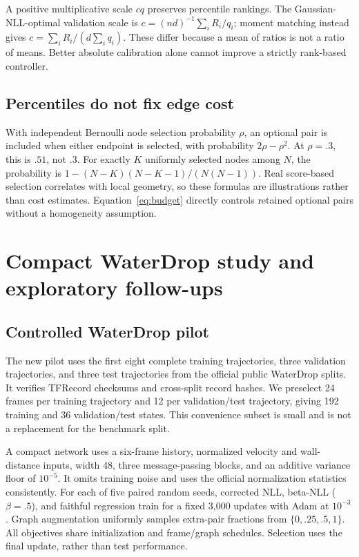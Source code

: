 A positive multiplicative scale $cq$ preserves percentile rankings. The Gaussian-NLL-optimal validation scale is $c=(nd)^{-1}\sum_iR_i/q_i$; moment matching instead gives $c=\sum_iR_i/(d\sum_iq_i)$. These differ because a mean of ratios is not a ratio of means. Better absolute calibration alone cannot improve a strictly rank-based controller.

\subsection{Percentiles do not fix edge cost}
With independent Bernoulli node selection probability $\rho$, an optional pair is included when either endpoint is selected, with probability $2\rho-\rho^2$. At $\rho=.3$, this is $.51$, not $.3$. For exactly $K$ uniformly selected nodes among $N$, the probability is $1-(N-K)(N-K-1)/(N(N-1))$. Real score-based selection correlates with local geometry, so these formulas are illustrations rather than cost estimates. Equation~\ref{eq:budget} directly controls retained optional pairs without a homogeneity assumption.



\section{Compact WaterDrop study and exploratory follow-ups}
\label{sec:compact-study}
\subsection{Controlled WaterDrop pilot}
The new pilot uses the first eight complete training trajectories, three validation trajectories, and three test trajectories from the official public WaterDrop splits. It verifies TFRecord checksums and cross-split record hashes. We preselect 24 frames per training trajectory and 12 per validation/test trajectory, giving 192 training and 36 validation/test states. This convenience subset is small and is not a replacement for the benchmark split.

A compact network uses a six-frame history, normalized velocity and wall-distance inputs, width 48, three message-passing blocks, and an additive variance floor of $10^{-5}$. It omits training noise and uses the official normalization statistics consistently. For each of five paired random seeds, corrected NLL, beta-NLL ($\beta=.5$), and faithful regression train for a fixed 3,000 updates with Adam at $10^{-3}$. Graph augmentation uniformly samples extra-pair fractions from $\{0,.25,.5,1\}$. All objectives share initialization and frame/graph schedules. Selection uses the final update, rather than test performance.

